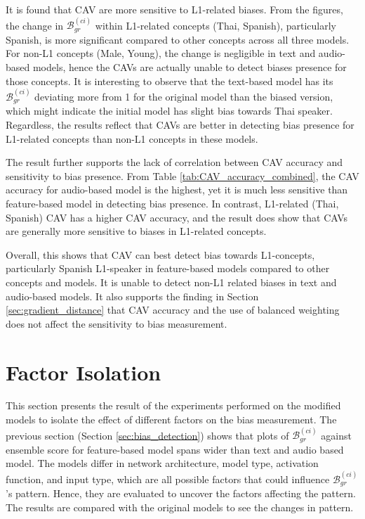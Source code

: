 It is found that CAV are more sensitive to L1-related biases. From the figures, the change in $\mathcal{B}^{(ci)}_{gr}$ within L1-related concepts (Thai, Spanish), particularly Spanish, is more significant compared to other concepts across all three models. For non-L1 concepts (Male, Young), the change is negligible in text and audio-based models, hence the CAVs are actually unable to detect biases presence for those concepts. It is interesting to observe that the text-based model has its $\mathcal{B}^{(ci)}_{gr}$ deviating more from 1 for the original model than the biased version, which might indicate the initial model has slight bias towards Thai speaker. Regardless, the results reflect that CAVs are better in detecting bias presence for L1-related concepts than non-L1 concepts in these models.

The result further supports the lack of correlation between CAV accuracy and sensitivity to bias presence. From Table \ref{tab:CAV_accuracy_combined}, the CAV accuracy for audio-based model is the highest, yet it is much less sensitive than feature-based model in detecting bias presence. In contrast, L1-related (Thai, Spanish) CAV has a higher CAV accuracy, and the result does show that CAVs are generally more sensitive to biases in L1-related concepts.

Overall, this shows that CAV can best detect bias towards L1-concepts, particularly Spanish L1-speaker in feature-based models compared to other concepts and models. It is unable to detect non-L1 related biases in text and audio-based models. It also supports the finding in Section \ref{sec:gradient_distance} that CAV accuracy and the use of balanced weighting does not affect the sensitivity to bias measurement.

\section{Factor Isolation} \label{sec:factor_isolation}
This section presents the result of the experiments performed on the modified models to isolate the effect of different factors on the bias measurement. The previous section (Section \ref{sec:bias_detection}) shows that plots of $\mathcal{B}^{(ci)}_{gr}$ against ensemble score for feature-based model spans wider than text and audio based model. The models differ in network architecture, model type, activation function, and input type, which are all possible factors that could influence $\mathcal{B}^{(ci)}_{gr}$'s pattern. Hence, they are evaluated to uncover the factors affecting the pattern. The results are compared with the original models to see the changes in pattern.

